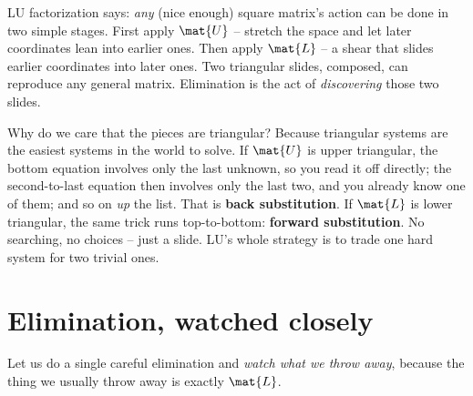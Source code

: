 \begin{intuitionbox}
LU factorization says: \emph{any} (nice enough) square matrix's action can be done in two
simple stages. First apply $\mat{U}$ -- stretch the space and let later coordinates lean
into earlier ones. Then apply $\mat{L}$ -- a shear that slides earlier coordinates into
later ones. Two triangular slides, composed, can reproduce any general matrix. Elimination
is the act of \emph{discovering} those two slides.
\end{intuitionbox}

Why do we care that the pieces are triangular? Because triangular systems are the easiest
systems in the world to solve. If $\mat{U}$ is upper triangular, the bottom equation
involves only the last unknown, so you read it off directly; the second-to-last equation
then involves only the last two, and you already know one of them; and so on \emph{up} the
list. That is \textbf{back substitution}. If $\mat{L}$ is lower triangular, the same trick
runs top-to-bottom: \textbf{forward substitution}. No searching, no choices -- just a slide.
LU's whole strategy is to trade one hard system for two trivial ones.

\section{Elimination, watched closely}
\label{ch09:elim-watched}

Let us do a single careful elimination and \emph{watch what we throw away}, because the
thing we usually throw away is exactly $\mat{L}$.

